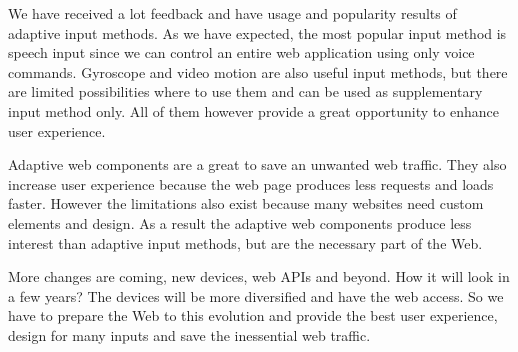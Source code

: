 \documentclass{iitsrc}
\begin{document}
We have received a lot feedback and have usage and popularity results of adaptive input methods. As we have expected, the most popular input method is speech input since we can control an entire web application using only voice commands. Gyroscope and video motion are also useful input methods, but there are limited possibilities where to use them and can be used as supplementary input method only. All of them however provide a great opportunity to enhance user experience.

Adaptive web components are a great to save an unwanted web traffic. They also increase user experience because the web page produces less requests and loads faster. However the limitations also exist because many websites need custom elements and design. As a result the adaptive web components produce less interest than adaptive input methods, but are the necessary part of the Web.

More changes are coming, new devices, web APIs and beyond. How it will look in a few years? The devices will be more diversified and have the web access. So we have to prepare the Web to this evolution and provide the best user experience, design for many inputs and save the inessential web traffic.




\end{document}
